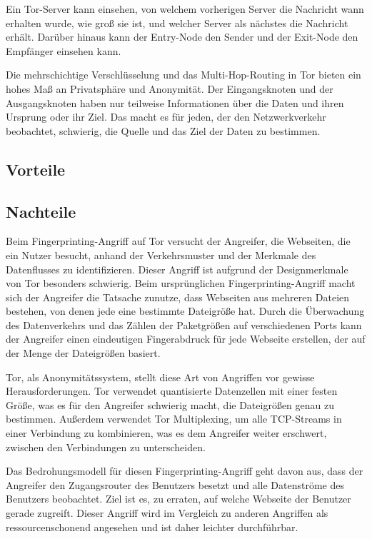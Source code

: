 Ein Tor-Server kann einsehen, von welchem vorherigen Server die Nachricht wann erhalten wurde, wie groß sie ist, und welcher Server als nächstes die Nachricht erhält. Darüber hinaus kann der Entry-Node den Sender und der Exit-Node den Empfänger einsehen kann.

Die mehrschichtige Verschlüsselung und das Multi-Hop-Routing in Tor bieten ein hohes Maß an Privatsphäre und Anonymität. Der Eingangsknoten und der Ausgangsknoten haben nur teilweise Informationen über die Daten und ihren Ursprung oder ihr Ziel. Das macht es für jeden, der den Netzwerkverkehr beobachtet, schwierig, die Quelle und das Ziel der Daten zu bestimmen\footnotemark{}.

\subsection{Vorteile}

\subsection{Nachteile}

Beim Fingerprinting-Angriff auf Tor versucht der Angreifer, die Webseiten, die ein Nutzer besucht, anhand der Verkehrsmuster und der Merkmale des Datenflusses zu identifizieren. Dieser Angriff ist aufgrund der Designmerkmale von Tor besonders schwierig. Beim ursprünglichen Fingerprinting-Angriff macht sich der Angreifer die Tatsache zunutze, dass Webseiten aus mehreren Dateien bestehen, von denen jede eine bestimmte Dateigröße hat. Durch die Überwachung des Datenverkehrs und das Zählen der Paketgrößen auf verschiedenen Ports kann der Angreifer einen eindeutigen Fingerabdruck für jede Webseite erstellen, der auf der Menge der Dateigrößen basiert.

Tor, als Anonymitätssystem, stellt diese Art von Angriffen vor gewisse Herausforderungen. Tor verwendet quantisierte Datenzellen mit einer festen Größe, was es für den Angreifer schwierig macht, die Dateigrößen genau zu bestimmen. Außerdem verwendet Tor Multiplexing, um alle TCP-Streams in einer Verbindung zu kombinieren, was es dem Angreifer weiter erschwert, zwischen den Verbindungen zu unterscheiden.

Das Bedrohungsmodell für diesen Fingerprinting-Angriff geht davon aus, dass der Angreifer den Zugangsrouter des Benutzers besetzt und alle Datenströme des Benutzers beobachtet. Ziel ist es, zu erraten, auf welche Webseite der Benutzer gerade zugreift. Dieser Angriff wird im Vergleich zu anderen Angriffen als ressourcenschonend angesehen und ist daher leichter durchführbar.

